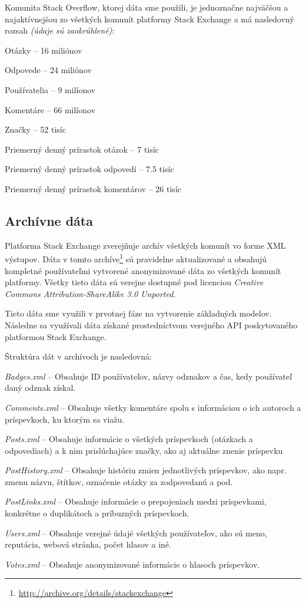 Komunita Stack Overflow, ktorej dáta sme použili, je jednoznačne najväčšou a najaktívnejšou zo všetkých komunít
platformy Stack Exchange a má nasledovný rozsah \emph{(údaje sú zaokrúhlené)}:

\begin{my_itemize}
    \item{Otázky -- 16 miliónov}
    \item{Odpovede -- 24 miliónov}
    \item{Používatelia -- 9 milíonov}
    \item{Komentáre -- 66 milíonov}
    \item{Značky -- 52 tisíc}
    \item{Priemerný denný prírastok otázok -- 7 tisíc}
    \item{Priemerný denný prírastok odpovedí -- 7.5 tisíc}
    \item{Priemerný denný prírastok komentárov -- 26 tisíc}
\end{my_itemize}

\subsection{Archívne dáta}
Platforma Stack Exchange zverejňuje archív všetkých komunít vo forme XML výstupov. Dáta v tomto
archíve\footnote{\url{http://archive.org/details/stackexchange}} sú pravidelne aktualizované a obsahujú kompletné
používateľmi vytvorené anonymizované dáta zo všetkých komunít platformy. Všetky tieto dáta sú verejne dostupné pod
licenciou \emph{Creative Commons Attribution-ShareAlike 3.0 Unported}.

Tieto dáta sme využili v prvotnej fáze na vytvorenie základných modelov. Následne sa využívali dáta získané
prostedníctvom verejného API poskytovaného platformou Stack Exchange.

Štruktúra dát v archívoch je nasledovná:

\begin{my_itemize}
  \item{\textit{Badges.xml} -- Obsahuje ID používateľov, názvy odznakov a čas, kedy používateľ daný odznak získal.}
  \item{\textit{Comments.xml} -- Obsahuje všetky komentáre spolu s informáciou o ich autoroch a príspevkoch, ku ktorým sa viažu.}
  \item{\textit{Posts.xml} -- Obsahuje informácie o všetkých príspevkoch (otázkach a odpovediach) a k nim prislúchajúce značky, ako aj aktuálne znenie príspevku}
  \item{\textit{PostHistory.xml} -- Obsahuje históriu zmien jednotlivých príspevkov, ako napr. zmenu názvu, štítkov, označenie otázky za zodpovedanú a pod.}
  \item{\textit{PostLinks.xml} -- Obsahuje informácie o prepojeniach medzi príspevkami, konkrétne o duplikátoch a príbuzných príspevkoch.}
  \item{\textit{Users.xml} -- Obsahuje verejné údajé všetkých používateľov, ako sú meno, reputácia, webová stránka, počet hlasov a iné.}
  \item{\textit{Votes.xml} -- Obsahuje anonymizované informácie o hlasoch príspevkov.}
\end{my_itemize}

